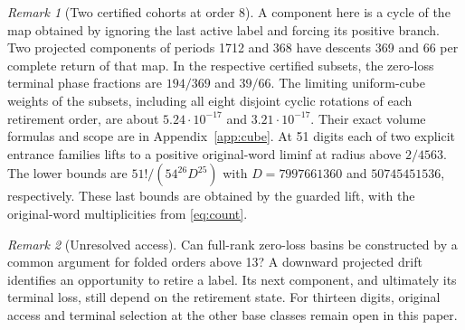\documentclass[11pt,reqno]{amsart}
\theoremstyle{remark}
\newtheorem*{remark}{Remark}
\begin{document}
\begin{remark}[Two certified cohorts at order 8]
A component here is a cycle of the map obtained by ignoring
the last active label and forcing its positive branch.
Two projected components of periods 1712 and 368 have
descents 369 and 66 per complete return of that map.
In the respective certified subsets, the zero-loss terminal
phase fractions are \(194/369\) and \(39/66\).
The limiting uniform-cube weights of the subsets, including
all eight disjoint cyclic rotations of each retirement order,
are about \(5.24\cdot10^{-17}\) and \(3.21\cdot10^{-17}\).
Their exact volume formulas and scope are in
Appendix~\ref{app:cube}. At 51 digits each of two explicit
entrance families lifts to a positive original-word liminf
at radius above \(2/4563\). The lower bounds are
\(51!/(54^{26}D^{25})\) with \(D=7997661360\) and
\(50745451536\), respectively. These last bounds are obtained
by the guarded lift, with the original-word multiplicities
from \eqref{eq:count}.
\end{remark}

\begin{remark}[Unresolved access]
Can full-rank zero-loss basins be constructed by a common argument
for folded orders above 13? A downward projected drift identifies
an opportunity to retire a label. Its next component, and ultimately
its terminal loss, still depend on the retirement state.
For thirteen digits, original access and terminal selection at
the other base classes remain open in this paper.
\end{remark}
\end{document}
